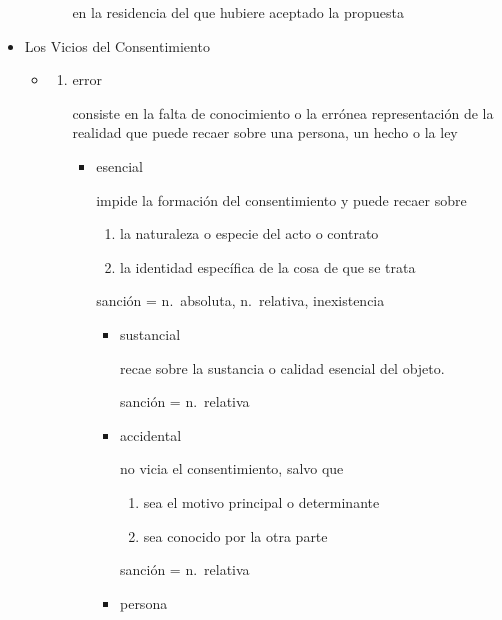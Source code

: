 \documentclass[]{article}
\providecommand{\tightlist}{%
  \setlength{\itemsep}{0pt}\setlength{\parskip}{0pt}}
\begin{document}
\begin{itemize}
\begin{itemize}
\begin{itemize}
      en la residencia del que hubiere aceptado la propuesta
    \end{itemize}
  \end{itemize}
\item
  Los Vicios del Consentimiento

  \begin{itemize}
  \item
    \begin{enumerate}
    \def\labelenumi{\alph{enumi})}
    \item
      error

      consiste en la falta de conocimiento o la errónea representación
      de la realidad que puede recaer sobre una persona, un hecho o la
      ley

      \begin{itemize}
      \item
        esencial

        impide la formación del consentimiento y puede recaer sobre

        \begin{enumerate}
        \def\labelenumii{\arabic{enumii}.}
        \tightlist
        \item
          la naturaleza o especie del acto o contrato
        \item
          la identidad específica de la cosa de que se trata
        \end{enumerate}

        sanción = n.~absoluta, n.~relativa, inexistencia

        \begin{itemize}
        \item
          sustancial

          recae sobre la sustancia o calidad esencial del objeto.

          sanción = n.~relativa
        \item
          accidental

          no vicia el consentimiento, salvo que

          \begin{enumerate}
          \def\labelenumii{\arabic{enumii}.}
          \tightlist
          \item
            sea el motivo principal o determinante
          \item
            sea conocido por la otra parte
          \end{enumerate}

          sanción = n.~relativa
        \item
          persona


\end{itemize}
\end{itemize}
\end{enumerate}
\end{itemize}
\end{itemize}
\end{document}
